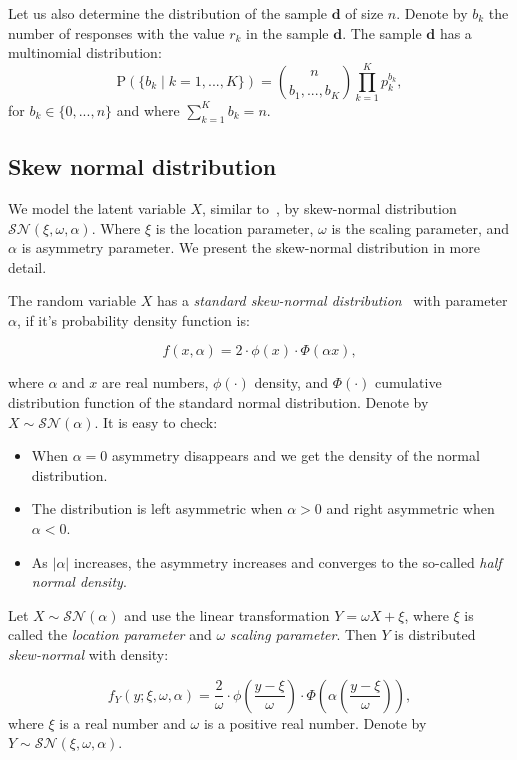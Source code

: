 \documentclass[10pt]{article}
\renewcommand{\vec}[1]{\mathbf{#1}}
\begin{document}
Let us also determine the distribution of the sample $\vec{d}$ of size $n$. Denote by $b_{k}$ the number of responses with the value $r_{k}$ in the sample $\vec{d}$. The sample $\vec{d}$ has a multinomial distribution:
\begin{equation} \label{eq: sampling}
\mathrm{P}(\lbrace b_{k} \mid k = 1,...,K \rbrace) = \binom{n}{b_{1}, ..., b_{K}} \prod_{k = 1}^{K} p_{k}^{b_{k}},
\end{equation}
for $b_{k} \in \lbrace 0, ..., n \rbrace$ and where $\sum_{k=1}^{K}{b_{k}} = n$.

\subsection{Skew normal distribution}
We model the latent variable $X$, similar to~\cite{Eijk}, by skew-normal distribution $\mathcal{SN}(\xi, \omega, \alpha)$. Where $\xi$ is the location parameter, $\omega$ is the scaling parameter, and $\alpha$ is asymmetry parameter. We present the skew-normal distribution in more detail.

The random variable $X$ has a {\it standard skew-normal distribution}~\cite{Azzalini} with parameter $\alpha$, if it's probability density function is:

\begin{equation}
f(x, \alpha) = 2 \cdot \phi(x) \cdot \Phi(\alpha x),
\end{equation}

where $\alpha$ and $x$ are real numbers, $\phi(\cdot)$ density, and $\Phi(\cdot)$ cumulative distribution function of the standard normal distribution. Denote by $X \sim \mathcal{SN}(\alpha)$. It is easy to check:
\begin{itemize}
	\item When $\alpha = 0$ asymmetry disappears and we get the density of the normal distribution.
	\item The distribution is left asymmetric when $\alpha > 0$ and right asymmetric when $\alpha < 0$.
	\item As $|\alpha|$ increases, the asymmetry increases and converges to the so-called {\it half normal density}.
\end{itemize}

Let $X \sim \mathcal{SN}(\alpha)$ and use the linear transformation $Y = \omega X + \xi$, where $\xi$ is called the {\it location parameter} and $\omega$ {\it scaling parameter}. Then $Y$ is distributed {\it skew-normal} with density:

\begin{equation}
f_{Y}(y; \xi, \omega, \alpha) = \frac{2}{\omega} \cdot
\phi\left(\frac{y - \xi}{\omega}\right) \cdot
\Phi\left(\alpha \left( \frac{y - \xi}{\omega} \right)\right),
\end{equation}
where $\xi$ is a real number and $\omega$ is a positive real number. Denote by $Y \sim \mathcal{SN}(\xi, \omega, \alpha)$. \\
\end{document}
